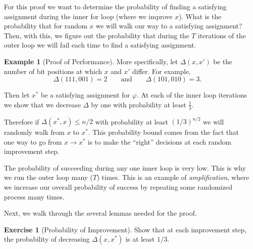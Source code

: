 \documentclass[11pt]{article}
\newif\ifsolutions
\theoremstyle{definition}
\newtheorem{example}[theorem]{Example}
\newtheorem{exercise}{Exercise}
\newtheorem*{solution}{Solution}
\begin{document}
For this proof we want to determine the probability of finding a
satisfying assignment during the inner for loop (where we improve
$x$). What is the probability that for random $x$ we will walk our way
to a satisfying assignment? Then, with this, we figure out the
probability that during the $T$ iterations of the outer loop we will fail each
time to find a satisfying assignment.

\begin{example}[Proof of Performance]
  More specifically, let $\Delta(x, x')$ be the number of bit
  positions at which $x$ and $x'$ differ. For example,
  \[ \Delta(111, 001) = 2 \qquad\text{and} \qquad \Delta(101, 010) = 3.\]

  Then let $x^*$ be a satisfying assignment for $\varphi$. At each of
  the inner loop iterations we show that we decrease $\Delta$ by one
  with probability at least $\frac13$.

  Therefore if $\Delta(x^*, x) \leq n/2$ with probability at least
  $(1/3)^{n/2}$ we will randomly walk from $x$ to $x^*$. This
  probability bound comes from the fact that one way to go from
  $x \to x^*$ is to make the ``right'' decisions at each random
  improvement step.

  The probability of succeeding during any one inner loop is very
  low. This is why we run the outer loop many ($T$) times. This is an
  example of \emph{amplification}, where we increase our overall
  probability of success by repeating some randomized process many
  times.
\end{example}

Next, we walk through the several lemmas needed for the proof.

\begin{exercise}[Probability of Improvement]
  Show that at each improvement step, the probability of decreasing
  $\Delta(x, x^*)$ is at least $1/3$.
\end{exercise}

\ifsolutions
\color{blue}
\begin{solution}
  On each unsatisfied clause, $x$ and $x^*$ must differ in at least
  one position (at least one of the variables in that clause must be
  ``wrong''). Therefore, the probability of \textsc{WalkSAT} choosing
  this variable to flip is $1/3$ because there are three variables in
  the clause chosen uniformly at random.
\end{solution}
\color{black}
\else
\vspace{1.25in}
\fi
\end{document}
